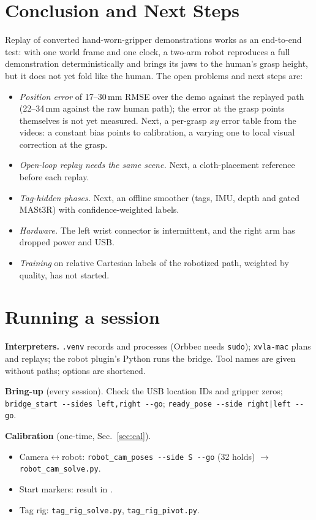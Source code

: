 \documentclass[conference,10pt]{IEEEtran}
\newcommand{\mm}{\,mm\xspace}
\begin{document}
\section{Conclusion and Next Steps}\label{sec:next}
Replay of converted hand-worn-gripper demonstrations works as an end-to-end test: with one world frame and one clock, a
two-arm robot reproduces a full demonstration deterministically and brings its jaws to the human's grasp height, but it
does not yet fold like the human. The open problems and next steps are:
\begin{itemize}
\item \emph{Position error} of 17--30\mm RMSE over the demo against the replayed path (22--34\mm against the raw
  human path); the error at the grasp points themselves is not yet measured. Next, a per-grasp $xy$ error table from the
  videos: a constant bias points to calibration, a varying one to local visual correction at the grasp.
\item \emph{Open-loop replay needs the same scene.} Next, a cloth-placement reference before each replay.
\item \emph{Tag-hidden phases.} Next, an offline smoother (tags, IMU, depth and gated MASt3R) with confidence-weighted
  labels.
\item \emph{Hardware.} The left wrist connector is intermittent, and the right arm has dropped power and USB.
\item \emph{Training} on relative Cartesian labels of the robotized path, weighted by quality, has not started.
\end{itemize}

\appendices
\section{Running a session}\label{app:run}
\raggedright
\noindent\textbf{Interpreters.} \texttt{.venv} records and processes (Orbbec needs \texttt{sudo}); \texttt{xvla-mac}
plans and replays; the robot plugin's Python runs the bridge. Tool names are given without paths; options are shortened.

\noindent\textbf{Bring-up} (every session). Check the USB location IDs and gripper zeros;
\texttt{bridge\_start -{}-sides left,right -{}-go}; \texttt{ready\_pose -{}-side right|left -{}-go}.

\noindent\textbf{Calibration} (one-time, Sec.~\ref{sec:cal}).
\begin{itemize}
\item Camera$\leftrightarrow$robot: \texttt{robot\_cam\_poses -{}-side S -{}-go} (32 holds) $\to$
  \texttt{robot\_cam\_solve.py}.
\item Start markers: result in .
\item Tag rig: \texttt{tag\_rig\_solve.py}, \texttt{tag\_rig\_pivot.py}.
\end{itemize}
\end{document}
